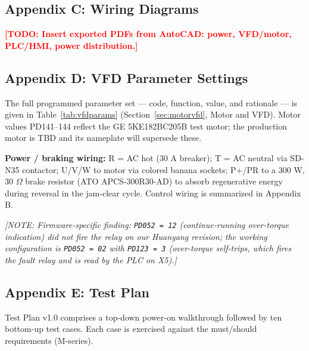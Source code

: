 \documentclass[hidelinks,12pt]{article}
\newcommand{\todo}[1]{\textcolor{red}{\textbf{[TODO: #1]}}}
\newcommand{\note}[1]{\textcolor{PSUblue}{\textit{[NOTE: #1]}}}
\begin{document}


\subsection{Appendix C: Wiring Diagrams}
\todo{Insert exported PDFs from AutoCAD: power, VFD/motor, PLC/HMI, power distribution.}

\subsection{Appendix D: VFD Parameter Settings}
The full programmed parameter set --- code, function, value, and rationale --- is given
in Table~\ref{tab:vfdparams} (Section~\ref{sec:motorvfd}, Motor and VFD). Motor values
PD141--144 reflect the GE 5KE182BC205B test motor; the production motor is TBD and its
nameplate will supersede these.

\textbf{Power / braking wiring:} R = AC hot (30 A breaker); T = AC neutral via SD-N35
contactor; U/V/W to motor via colored banana sockets; P+/PR to a 300 W, 30 $\Omega$
brake resistor (ATO APCS-300R30-AD) to absorb regenerative energy during reversal in
the jam-clear cycle. Control wiring is summarized in Appendix B.

\note{Firmware-specific finding: \texttt{PD052 = 12} (continue-running over-torque
indication) did not fire the relay on our Huanyang revision; the working configuration
is \texttt{PD052 = 02} with \texttt{PD123 = 3} (over-torque self-trips, which fires the
fault relay and is read by the PLC on X5).}

\subsection{Appendix E: Test Plan}
Test Plan v1.0 comprises a top-down power-on walkthrough followed by ten bottom-up
test cases. Each case is exercised against the must/should requirements (M-series).
\end{document}

